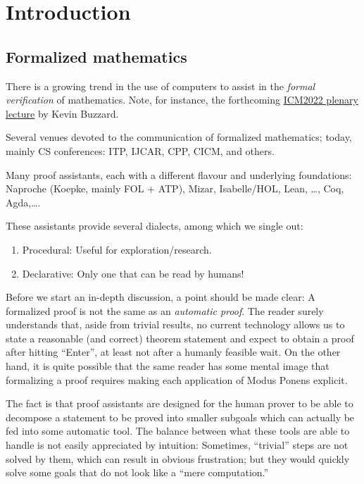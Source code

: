 \section{Introduction}
\label{sec:introduction}

\subsection{Formalized mathematics}
There is a growing trend in the use of computers to assist in the
\emph{formal verification} of mathematics. Note, for instance, the forthcoming
\href{https://web.archive.org/web/20211220044218/https://icm2022.org/plenary-lectures#Kevin-Buzzard}{ICM2022
  plenary lecture} by Kevin Buzzard.

Several venues devoted to the communication of formalized mathematics;
today, mainly CS conferences: ITP, IJCAR, CPP, CICM, and others.

Many proof assistants, each with a different flavour and underlying
foundations: Naproche (Koepke, mainly FOL + ATP), Mizar,
Isabelle/HOL, Lean, \dots, Coq, Agda,\dots.

These assistants provide several dialects, among which we single out:
\begin{enumerate}
\item Procedural: Useful for exploration/research.
\item Declarative: Only one that can be read by humans!
\end{enumerate}

Before we start an in-depth discussion, a point should be made clear:
A formalized proof is not the same as an \emph{automatic proof}. The
reader surely understands that, aside from trivial results, no current
technology allows us to state a reasonable (and correct) theorem
statement and expect to obtain a proof after hitting ``Enter'', at
least not after a humanly feasible wait. On the other hand, it is
quite possible that the same reader has some mental image that
formalizing a proof requires making each application of Modus Ponens
explicit.

The fact is that proof assistants are designed for the human prover to
be able to decompose a statement to be proved into smaller subgoals
which can actually be fed into some automatic tool. The balance between
what these tools are able to handle is not  easily appreciated by
intuition: Sometimes, ``trivial'' steps are not solved by them, which
can result in obvious frustration; but they would quickly solve some
goals that do not look like a ``mere computation.''

